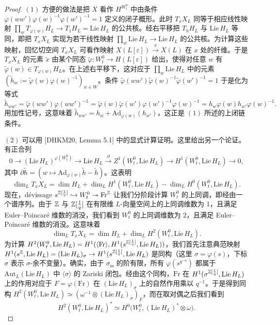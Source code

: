 \begin{proof}
$(1)$ 方便的做法是把 $X$ 看作 $H^{W^0_t}$ 中由条件 $\varphi(ww')\varphi(w)^{-1}\varphi(w')^{-1}=1$ 定义的闭子概形。此时 $T_xX_L$ 同等于相应线性映射 $\prod_w T_{\varphi(w)}H_L\to T_1H_L=\mathrm{Lie}\,H_L$ 的公共核。经右平移把 $T_hH_L$ 与 $\mathrm{Lie}\,H_L$ 等同，即把 $T_xX_L$ 实现为若干线性映射 $\prod_w\mathrm{Lie}\,H_L\to\mathrm{Lie}\,H_L$ 的公共核。为计算这些映射，回忆切空间 $T_xX_L$ 可看作映射 $X(L[\varepsilon])\xrightarrow{\pi}X(L)$ 在 $x$ 处的纤维。于是 $T_xX_L$ 的元素 $\tilde x$ 由某个同态 $\tilde\varphi:W^0_t\to H(L[\varepsilon])$ 给出，使得对任意 $w$ 有 $\tilde\varphi(w)\in T_{\varphi(w)}H_L$。在上述右平移下，这对应于 $\prod_w\mathrm{Lie}\,H_L$ 中的元素 $(\tilde h_w:=\tilde\varphi(w)\varphi(w)^{-1})_{w\in W}$。条件 $\tilde\varphi(ww')\tilde\varphi(w)^{-1}\tilde\varphi(w')^{-1}=1$ 于是化为等式
\[
\tilde h_{ww'}=\tilde\varphi(ww')\varphi(ww')^{-1}=\tilde\varphi(w)\tilde\varphi(w')\varphi(w')^{-1}\varphi(w)^{-1}=h_w\varphi(w)h_{w'}\varphi(w)^{-1}.
\]
用加性记号，这意味着 $\tilde h_{ww'}=h_w+\mathrm{Ad}_{\varphi(w)}(h_{w'})$，这正是 $(1)$ 所述的上闭链条件。

$(2)$ 可以用 [DHKM20, Lemma 5.1] 中的显式计算证明。这里给出另一个论证。有正合列
\[
0\to(\mathrm{Lie}\,H_L)^{\varphi(W^0_t)}\to\mathrm{Lie}\,H_L\xrightarrow{\ \partial\ }Z^1(W^0_t,\mathrm{Lie}\,H_L)\to H^1(W^0_t,\mathrm{Lie}\,H_L)\to0,
\]
其中 $\partial\tilde h=(w\mapsto\mathrm{Ad}_{\varphi(w)}\tilde h-\tilde h)$。这表明
\[
\dim_L T_xX_L=\dim H_L+\dim_L H^1(W^0_t,\mathrm{Lie}\,H_L)-\dim_L H^0(W^0_t,\mathrm{Lie}\,H_L).
\]
现在，dévissage $s^{\mathbb{Z}[\frac1q]}\hookrightarrow W^0_t\twoheadrightarrow\mathrm{Fr}^{\mathbb{Z}}$ 让我们分阶段计算 $W^0_t$ 的上同调，即经由一个谱序列。由于 $\mathbb{Z}$ 与 $\mathbb{Z}[\frac1q]$ 在有限维 $L$-向量空间上的上同调维数为 1，且满足 Euler–Poincaré 维数的消没，我们看到 $W^0_t$ 的上同调维数为 2，且满足 Euler–Poincaré 维数的消没。这意味着
\[
\dim_L T_xX_L=\dim H_L+\dim_L H^2(W^0_t,\mathrm{Lie}\,H_L).
\]
为计算 $H^2(W^0_t,\mathrm{Lie}\,H_L)=H^1(\langle\mathrm{Fr}\rangle,H^1(s^{\mathbb{Z}[\frac1q]},\mathrm{Lie}\,H_L))$，我们首先注意典范映射 $H^1(s^{\mathbb{Z}},\mathrm{Lie}\,H_L)=(\mathrm{Lie}\,H_L)_\sigma\to H^1(s^{\mathbb{Z}[\frac1q]},\mathrm{Lie}\,H_L)$ 是同构（这里 $\sigma=\varphi(s)$，下标 $\sigma$ 表示 $\sigma$-余不变量）。确实，由于 $\sigma_{\mathrm{ss}}$ 的阶有限，所有 $\varphi(s^{q^{-n}})$ 都属于 $\mathrm{Aut}_L(\mathrm{Lie}\,H_L)$ 中 $\langle\sigma\rangle$ 的 Zariski 闭包。经由这个同构，$\mathrm{Fr}$ 在 $H^1(\sigma^{\mathbb{Z}[\frac1q]},\mathrm{Lie}\,H_L)$ 上的作用对应于 $F=\varphi(\mathrm{Fr})$ 在 $(\mathrm{Lie}\,H_L)_\sigma$ 上的自然作用乘以 $q^{-1}$。于是得到同构 $H^2(W^0_t,\mathrm{Lie}\,H_L)\simeq(\omega^{-1}\otimes(\mathrm{Lie}\,H_L)_\sigma)_F$，而在取对偶之后我们看到
\[
H^2(W^0_t,\mathrm{Lie}\,H_L)^*\simeq H^0\bigl(W^0_t,(\mathrm{Lie}\,H_L)^*\otimes\omega\bigr).
\]
\end{proof}

